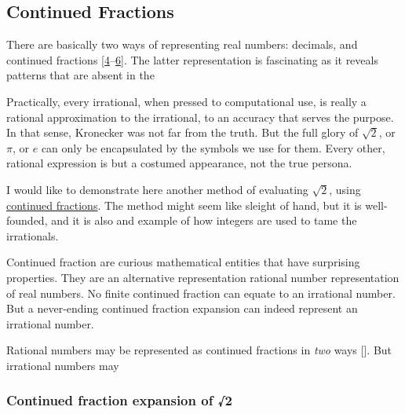 \documentclass[
  a4paper,
]{article}
\begin{document}
\hypertarget{continued-fractions}{%
\subsection{Continued Fractions}\label{continued-fractions}}

There are basically two ways of representing real numbers: decimals, and
continued fractions
{[}\protect\hyperlink{ref-niven1991}{4}--\protect\hyperlink{ref-simoson2019}{6}{]}.
The latter representation is fascinating as it reveals patterns that are
absent in the

Practically, every irrational, when pressed to computational use, is
really a rational approximation to the irrational, to an accuracy that
serves the purpose. In that sense, Kronecker was not far from the truth.
But the full glory of \(\sqrt{2}\), or \(\pi\), or \(e\) can only be
encapsulated by the symbols we use for them. Every other, rational
expression is but a costumed appearance, not the true persona.

I would like to demonstrate here another method of evaluating
\(\sqrt{2}\), using
\href{https://en.wikipedia.org/wiki/Continued_fraction}{continued
fractions}. The method might seem like sleight of hand, but it is
well-founded, and it is also and example of how integers are used to
tame the irrationals.

Continued fraction are curious mathematical entities that have
surprising properties. They are an alternative representation rational
number representation of real numbers. No finite continued fraction can
equate to an irrational number. But a never-ending continued fraction
expansion can indeed represent an irrational number.

Rational numbers may be represented as continued fractions in \emph{two}
ways {[}{]}. But irrational numbers may

\hypertarget{continued-fraction-expansion-of-2}{%
\subsubsection{Continued fraction expansion of
√2}\label{continued-fraction-expansion-of-2}}
\end{document}
